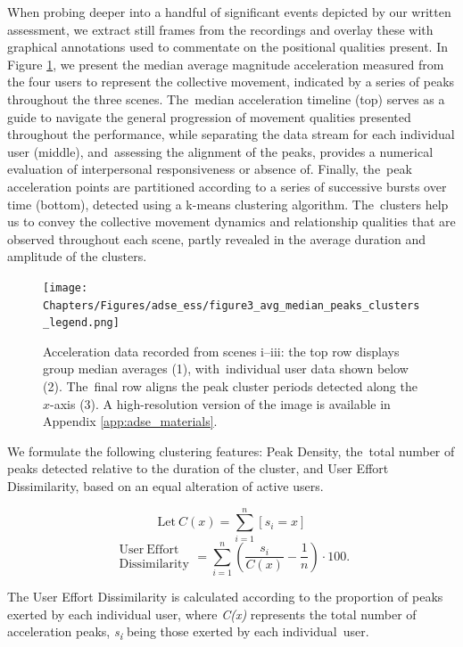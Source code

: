 When probing deeper into a handful of significant events depicted by our written assessment, we extract still frames from the recordings and overlay these with graphical annotations used to commentate on the positional qualities present. In Figure \ref{fig:sensor_data}, we present the median average magnitude acceleration measured from the four users to represent the collective movement, indicated by a series of peaks throughout the three scenes. The~median acceleration timeline (top) serves as a guide to navigate the general progression of movement qualities presented throughout the performance, while separating the data stream for each individual user (middle), and~assessing the alignment of the peaks, provides a numerical evaluation of interpersonal responsiveness or absence of. Finally, the~peak acceleration points are partitioned according to a series of successive bursts over time (bottom), detected using a k-means clustering algorithm. The~clusters help us to convey the collective movement dynamics and relationship qualities that are observed throughout each scene, partly revealed in the average duration and amplitude of the clusters.

\begin{figure}
\texttt{[image: Chapters/Figures/adse\_ess/figure3\_avg\_median\_peaks\_clusters\_legend.png]}
\caption{Acceleration data recorded from scenes
 i--iii: the top row displays group median averages (1), with~individual user data shown below (2). The~final row aligns the peak cluster periods detected along the $x$-axis (3).
A high-resolution version of the image is available in Appendix \ref{app:adse_materials}.}\label{fig:sensor_data}
\end{figure}

We formulate the following clustering features:
Peak Density, the~total number of peaks detected relative to the duration of the cluster, and User Effort Dissimilarity, based on an equal alteration of active users.

\[
 \mathrm{Let}\ C(x)=\sum_{i=1}^{n}[s_i=x]
\]
\begin{equation}
\begin{split}
\mathrm{User\ Effort\ }\\ \mathrm{Dissimilarity}
\end{split}
= \sum_{i=1}^{n} (\frac{s_i}{C(x)} - \frac{1}{n})\cdot100 .
\end{equation}

The User Effort Dissimilarity is calculated according to the proportion of peaks exerted by each individual user, where \textit{C(x)} represents the total number of acceleration peaks, \textit{s\textsubscript{i}} being those exerted by each individual~user.

